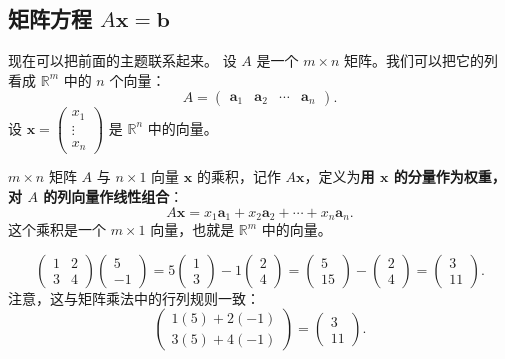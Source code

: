 \subsection{矩阵方程 \texorpdfstring{$A\mathbf{x}=\mathbf{b}$}{Ax=b}}

现在可以把前面的主题联系起来。
设 $A$ 是一个 $m\times n$ 矩阵。我们可以把它的列看成 $\mathbb{R}^m$ 中的 $n$ 个向量：
\[
A=\begin{pmatrix}\mathbf{a}_1&\mathbf{a}_2&\cdots&\mathbf{a}_n\end{pmatrix}.
\]
设 $\mathbf{x}=\begin{pmatrix}x_1\\\vdots\\x_n\end{pmatrix}$ 是 $\mathbb{R}^n$ 中的向量。

\begin{definition}[矩阵与向量的乘积]
$m\times n$ 矩阵 $A$ 与 $n\times1$ 向量 $\mathbf{x}$ 的乘积，记作 $A\mathbf{x}$，定义为\textbf{用 $\mathbf{x}$ 的分量作为权重，对 $A$ 的列向量作线性组合}：
\[
A\mathbf{x}=x_1\mathbf{a}_1+x_2\mathbf{a}_2+\cdots+x_n\mathbf{a}_n.
\]
这个乘积是一个 $m\times1$ 向量，也就是 $\mathbb{R}^m$ 中的向量。
\end{definition}

\begin{example}
\[
\begin{pmatrix}1&2\\3&4\end{pmatrix}\begin{pmatrix}5\\-1\end{pmatrix}
=5\begin{pmatrix}1\\3\end{pmatrix}-1\begin{pmatrix}2\\4\end{pmatrix}
=\begin{pmatrix}5\\15\end{pmatrix}-\begin{pmatrix}2\\4\end{pmatrix}
=\begin{pmatrix}3\\11\end{pmatrix}.
\]
注意，这与矩阵乘法中的行列规则一致：
\[
\begin{pmatrix}1(5)+2(-1)\\3(5)+4(-1)\end{pmatrix}=\begin{pmatrix}3\\11\end{pmatrix}.
\]
\end{example}


